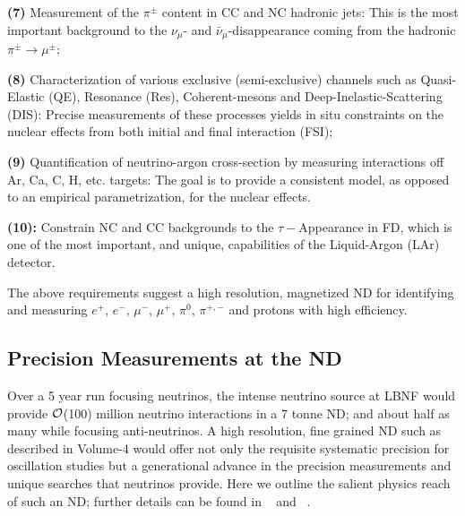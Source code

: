 \vspace{0.25cm} 
\noindent
{\bf (7)} Measurement of the $\pi^{\pm}$ content in 
CC and NC hadronic jets:  This is the most important background to 
the $\nu_\mu$- and $\bar \nu_\mu$-disappearance coming from  the hadronic   $\pi^{\pm} \rightarrow \mu^{\pm}$; 

\vspace{0.25cm} 
\noindent
{\bf (8)} Characterization of various exclusive (semi-exclusive) 
channels such as Quasi-Elastic (QE), Resonance (Res), 
Coherent-mesons and Deep-Inelastic-Scattering (DIS): 
Precise measurements of these processes yields  
 in situ constraints on the nuclear effects from both initial and final interaction (FSI); 

\vspace{0.25cm} 
\noindent 
{\bf (9)} Quantification of neutrino-argon cross-section 
by measuring interactions off Ar, Ca, C, H, etc. targets: The goal is to provide 
a consistent model, as opposed to an empirical parametrization, for the nuclear effects. 



\vspace{0.25cm} 
\noindent 
{\bf (10):} Constrain NC and CC backgrounds to the {\boldmath $\tau-$}Appearance in FD, 
which is one of the most important, and unique, capabilities of the Liquid-Argon (LAr) detector. 

\noindent
The above requirements suggest a high resolution, magnetized ND for identifying and 
measuring $e^+$, $e^-$, $\mu^-$, $\mu^+$, $\pi^0$, $\pi^{+,-}$ and protons  with high efficiency. 



\subsection{Precision Measurements at the ND} 
\label{sec-nd-sbp} 

\noindent
Over a 5 year run focusing neutrinos,  the intense neutrino source at LBNF would provide 
${\cal {O}}$(100) million neutrino interactions in a 7 tonne ND; 
and about half as many while focusing anti-neutrinos. 
A high resolution, fine grained ND such as described in Volume-4 would offer not only the requisite systematic 
precision for  oscillation studies but a generational advance in the precision measurements and unique 
searches  that neutrinos provide. Here we outline the salient physics reach of such an ND; further details can be 
found in ~\cite{DPR} and ~\cite{Adams:2013qkq}. 

